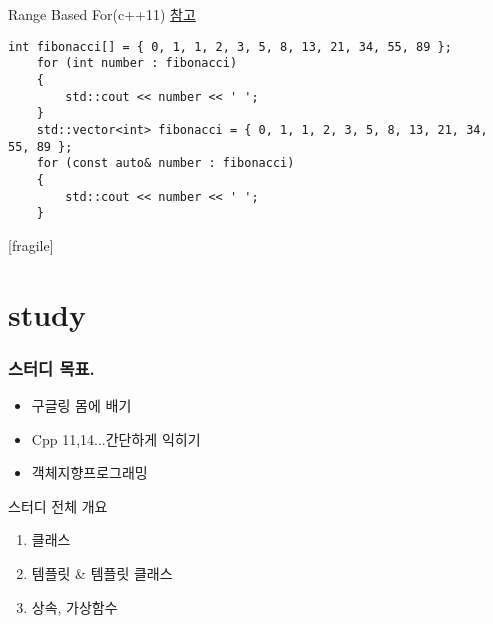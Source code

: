 \documentclass[10pt]{beamer}
\begin{document}
\begin{frame}{Range Based For(c++11)}
    \href{https://www.youtube.com/watch?v=sVoz36DYK5s&list=PLW_uvsSPlijtSmrhajc3Y02G86lOieQOb}{참고}
    
    \begin{lstlisting}[style = CStyle]
    int fibonacci[] = { 0, 1, 1, 2, 3, 5, 8, 13, 21, 34, 55, 89 }; 
    for (int number : fibonacci)
    {
        std::cout << number << ' ';
    }
    std::vector<int> fibonacci = { 0, 1, 1, 2, 3, 5, 8, 13, 21, 34, 55, 89 }; 
    for (const auto& number : fibonacci) 
    {
        std::cout << number << ' ';
    }
    \end{lstlisting}

\end{frame}    

\begin{frame}{}


\end{frame}    
\begin{frame}{}


\end{frame}    
\begin{frame}{}


\end{frame}    
\begin{frame}{}[fragile] 


\end{frame}    


\section{study}


\begin{frame}[fragile] 
    \frametitle{스터디 목표.}
    \begin{itemize}
        \item 구글링 몸에 배기
        \item Cpp 11,14...간단하게 익히기
        \item 객체지향프로그래밍
    \end{itemize}
\end{frame}

\begin{frame}{스터디 전체 개요}
    \begin{enumerate}
        \item 클래스
        \item 템플릿 \& 템플릿 클래스
        \item 상속, 가상함수
    \end{enumerate}
\end{frame}
\end{document}
